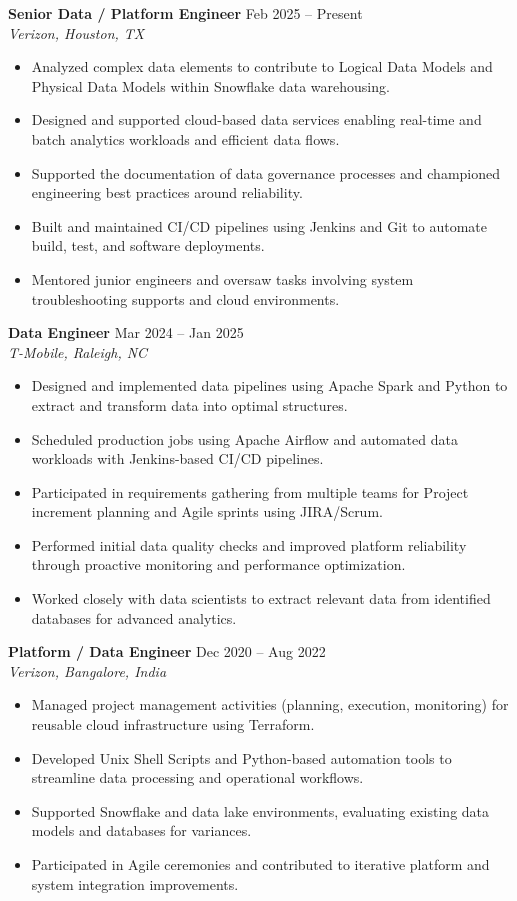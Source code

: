 \documentclass[10pt]{article}
\begin{document}
\textbf{Senior Data / Platform Engineer} \hfill Feb 2025 -- Present \\
\textit{Verizon, Houston, TX}
\begin{itemize}[leftmargin=*, itemsep=3pt]
    \item Analyzed complex data elements to contribute to Logical Data Models and Physical Data Models within Snowflake data warehousing.
    \item Designed and supported cloud-based data services enabling real-time and batch analytics workloads and efficient data flows.
    \item Supported the documentation of data governance processes and championed engineering best practices around reliability.
    \item Built and maintained CI/CD pipelines using Jenkins and Git to automate build, test, and software deployments.
    \item Mentored junior engineers and oversaw tasks involving system troubleshooting supports and cloud environments.
\end{itemize}

\textbf{Data Engineer} \hfill Mar 2024 -- Jan 2025 \\
\textit{T-Mobile, Raleigh, NC}
\begin{itemize}[leftmargin=*, itemsep=3pt]
    \item Designed and implemented data pipelines using Apache Spark and Python to extract and transform data into optimal structures.
    \item Scheduled production jobs using Apache Airflow and automated data workloads with Jenkins-based CI/CD pipelines.
    \item Participated in requirements gathering from multiple teams for Project increment planning and Agile sprints using JIRA/Scrum.
    \item Performed initial data quality checks and improved platform reliability through proactive monitoring and performance optimization.
    \item Worked closely with data scientists to extract relevant data from identified databases for advanced analytics.
\end{itemize}

\textbf{Platform / Data Engineer} \hfill Dec 2020 -- Aug 2022 \\
\textit{Verizon, Bangalore, India}
\begin{itemize}[leftmargin=*, itemsep=3pt]
    \item Managed project management activities (planning, execution, monitoring) for reusable cloud infrastructure using Terraform.
    \item Developed Unix Shell Scripts and Python-based automation tools to streamline data processing and operational workflows.
    \item Supported Snowflake and data lake environments, evaluating existing data models and databases for variances.
    \item Participated in Agile ceremonies and contributed to iterative platform and system integration improvements.
\end{itemize}
\end{document}
